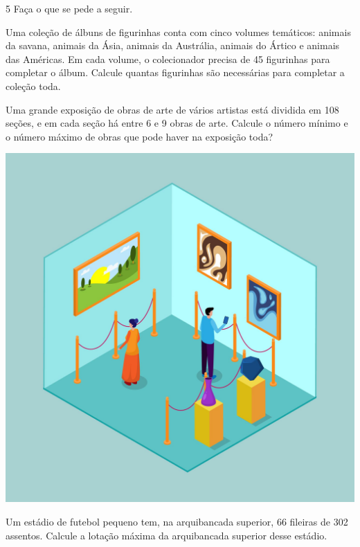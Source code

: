 \num{5} Faça o que se pede a seguir.

\begin{escolha}
\item Uma coleção de álbuns de figurinhas conta com cinco volumes temáticos: animais da savana, animais da Ásia, animais da Austrália, animais do Ártico e animais das Américas. Em cada volume, o colecionador precisa de 45 figurinhas para completar o álbum. Calcule quantas figurinhas são necessárias para completar a coleção toda.\\

\item Uma grande exposição de obras de arte de vários artistas está dividida em 108 seções, e em cada seção há entre 6 e 9 obras de arte. Calcule o número mínimo e o número máximo de obras que pode haver na exposição toda?
\end{escolha}

\begin{center}
\includegraphics[width=.5\textwidth]{media/image14c.jpeg}
\end{center}


\begin{escolha}
\item Um estádio de futebol pequeno tem, na arquibancada superior, 66 fileiras de 302 assentos. Calcule a lotação máxima da arquibancada superior desse estádio.\\
\end{escolha}

